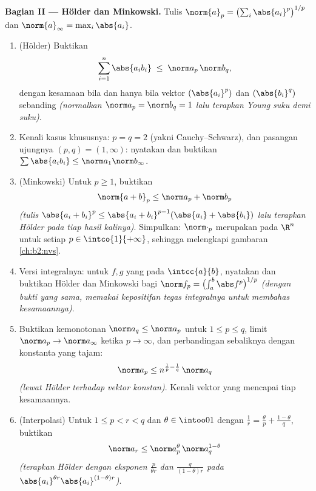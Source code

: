 \begin{problem}
\medskip
\noindent\textbf{Bagian II --- Hölder dan Minkowski.} Tulis
$\norm{a}_p = \bigl(\sum_i \abs{a_i}^p\bigr)^{1/p}$ dan
$\norm{a}_\infty = \max_i\abs{a_i}$.
\begin{enumerate}[resume]
  \item (Hölder) Buktikan
        \[
        \sum_{i=1}^{n}\abs{a_ib_i} \;\leq\;
        \norm a_p\,\norm b_q ,
        \]
        dengan kesamaan bila dan hanya bila vektor $(\abs{a_i}^p)$ dan
        $(\abs{b_i}^q)$ sebanding \emph{(normalkan
        $\norm a_p = \norm b_q = 1$ lalu terapkan Young suku demi suku)}.
  \item Kenali kasus khususnya: $p = q = 2$
        (yakni Cauchy--Schwarz), dan pasangan ujungnya $(p, q) = (1,
        \infty)$: nyatakan dan buktikan $\sum\abs{a_ib_i} \leq
        \norm a_1\norm b_\infty$.
  \item (Minkowski) Untuk $p \geq 1$, buktikan
        \[
        \norm{a + b}_p \leq \norm a_p + \norm b_p
        \]
        \emph{(tulis $\abs{a_i + b_i}^p \leq \abs{a_i +
        b_i}^{p-1}(\abs{a_i} + \abs{b_i})$ lalu terapkan Hölder
        pada tiap hasil kalinya)}. Simpulkan: $\norm\cdot_p$ merupakan
         pada $\R^n$ untuk setiap $p \in \intco{1}{+\infty}$,
        sehingga melengkapi gambaran \cref{ch:b2:nvs}.
  \item Versi integralnya: untuk $f, g$ yang  pada
        $\intcc{a}{b}$, nyatakan dan buktikan Hölder dan Minkowski
        bagi $\norm f_p = \bigl(\int_a^b\abs
        f^p\bigr)^{1/p}$ \emph{(dengan bukti yang sama, memakai
        kepositifan tegas integralnya untuk membahas
        kesamaannya)}.
  \item Buktikan kemonotonan $\norm a_q \leq \norm a_p$ untuk $1
        \leq p \leq q$, limit $\norm a_p \to
        \norm a_\infty$ ketika $p \to \infty$, dan perbandingan
        sebaliknya dengan konstanta yang tajam:
        \[
        \norm a_p \leq n^{\frac1p - \frac1q}\,\norm a_q
        \]
        \emph{(lewat Hölder terhadap vektor konstan)}. Kenali
        vektor yang mencapai tiap kesamaannya.
  \item (Interpolasi) Untuk $1 \leq p < r < q$ dan $\theta \in
        \intoo01$ dengan $\frac1r = \frac\theta p +
        \frac{1-\theta}q$, buktikan
        \[
        \norm a_r \leq \norm a_p^{\theta}\,
        \norm a_q^{1-\theta}
        \]
        \emph{(terapkan Hölder dengan eksponen $\frac{p}{\theta
        r}$ dan $\frac{q}{(1-\theta)r}$ pada $\abs{a_i}^{\theta
        r}\abs{a_i}^{(1-\theta)r}$)}.
\end{enumerate}


\end{problem}
